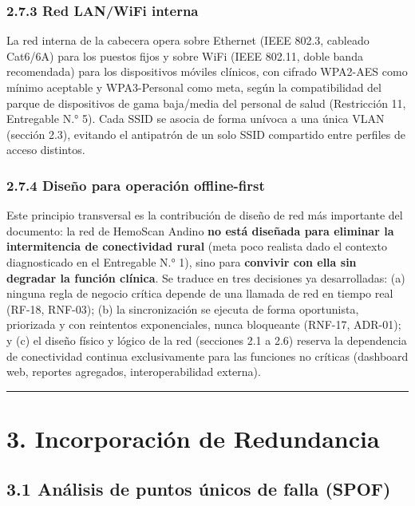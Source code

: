 \documentclass[11pt,a4paper]{article}
\begin{document}
\subsubsection{2.7.3 Red LAN/WiFi interna}\label{red-lanwifi-interna}

La red interna de la cabecera opera sobre Ethernet (IEEE 802.3, cableado Cat6/6A) para los puestos fijos y sobre WiFi (IEEE 802.11, doble banda recomendada) para los dispositivos móviles clínicos, con cifrado WPA2-AES como mínimo aceptable y WPA3-Personal como meta, según la compatibilidad del parque de dispositivos de gama baja/media del personal de salud (Restricción 11, Entregable N.° 5). Cada SSID se asocia de forma unívoca a una única VLAN (sección 2.3), evitando el antipatrón de un solo SSID compartido entre perfiles de acceso distintos.

\subsubsection{2.7.4 Diseño para operación offline-first}\label{diseuxf1o-para-operaciuxf3n-offline-first}

Este principio transversal es la contribución de diseño de red más importante del documento: la red de HemoScan Andino \textbf{no está diseñada para eliminar la intermitencia de conectividad rural} (meta poco realista dado el contexto diagnosticado en el Entregable N.° 1), sino para \textbf{convivir con ella sin degradar la función clínica}. Se traduce en tres decisiones ya desarrolladas: (a) ninguna regla de negocio crítica depende de una llamada de red en tiempo real (RF-18, RNF-03); (b) la sincronización se ejecuta de forma oportunista, priorizada y con reintentos exponenciales, nunca bloqueante (RNF-17, ADR-01); y (c) el diseño físico y lógico de la red (secciones 2.1 a 2.6) reserva la dependencia de conectividad continua exclusivamente para las funciones no críticas (dashboard web, reportes agregados, interoperabilidad externa).

\begin{center}\rule{0.5\linewidth}{0.5pt}\end{center}

\section{3. Incorporación de Redundancia}\label{incorporaciuxf3n-de-redundancia}

\subsection{3.1 Análisis de puntos únicos de falla (SPOF)}\label{anuxe1lisis-de-puntos-uxfanicos-de-falla-spof}
\end{document}
